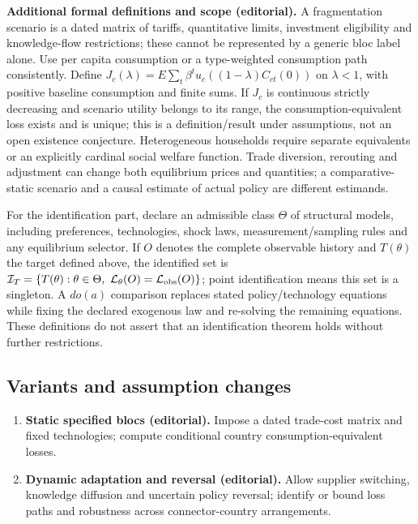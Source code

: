 \documentclass[11pt,a4paper]{article}
\begin{document}
\textbf{Additional formal definitions and scope (editorial).} A fragmentation scenario is a dated matrix of tariffs, quantitative limits, investment eligibility and knowledge-flow restrictions; these cannot be represented by a generic bloc label alone. Use per capita consumption or a type-weighted consumption path consistently. Define \(J_c(\lambda)=E\sum_t\beta^t u_c((1-\lambda)C_{ct}(0))\) on \(\lambda<1\), with positive baseline consumption and finite sums. If \(J_c\) is continuous strictly decreasing and scenario utility belongs to its range, the consumption-equivalent loss exists and is unique; this is a definition/result under assumptions, not an open existence conjecture. Heterogeneous households require separate equivalents or an explicitly cardinal social welfare function. Trade diversion, rerouting and adjustment can change both equilibrium prices and quantities; a comparative-static scenario and a causal estimate of actual policy are different estimands.

For the identification part, declare an admissible class \(\Theta\) of structural models, including preferences, technologies, shock laws, measurement/sampling rules and any equilibrium selector. If \(O\) denotes the complete observable history and \(T(\theta)\) the target defined above, the identified set is \(\mathcal I_T=\{T(\theta):\theta\in\Theta,\ \mathcal L_\theta(O)=\mathcal L_{\rm obs}(O)\}\); point identification means this set is a singleton. A \(do(a)\) comparison replaces stated policy/technology equations while fixing the declared exogenous law and re-solving the remaining equations. These definitions do not assert that an identification theorem holds without further restrictions.
\subsection*{Variants and assumption changes}
\begin{enumerate}
\item \textbf{Static specified blocs (editorial).} Impose a dated trade-cost matrix and fixed technologies; compute conditional country consumption-equivalent losses.
\item \textbf{Dynamic adaptation and reversal (editorial).} Allow supplier switching, knowledge diffusion and uncertain policy reversal; identify or bound loss paths and robustness across connector-country arrangements.
\end{enumerate}
\end{document}
